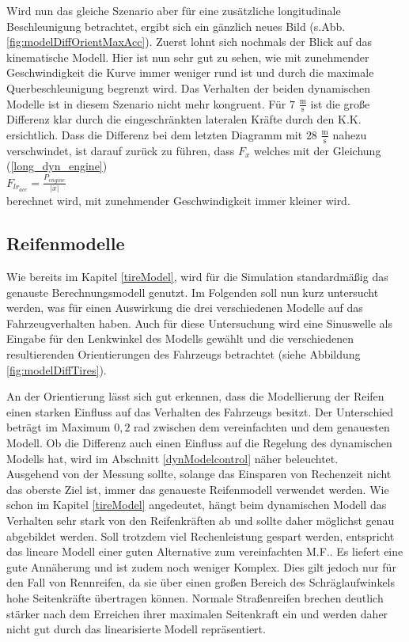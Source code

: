 \documentclass{like}
\begin{document}
Wird nun das gleiche Szenario aber für eine zusätzliche longitudinale Beschleunigung betrachtet, ergibt sich ein gänzlich neues Bild (s.Abb. \ref{fig:modelDiffOrientMaxAcc}).
Zuerst lohnt sich nochmals der Blick auf das kinematische Modell. Hier ist nun sehr gut zu sehen, wie mit zunehmender Geschwindigkeit die Kurve immer weniger rund ist und durch die maximale Querbeschleunigung begrenzt wird. Das Verhalten der beiden dynamischen Modelle ist in diesem Szenario nicht mehr kongruent. Für $7$ $\frac{\text{m}}{\text{s}}$ ist die große Differenz klar durch die eingeschränkten lateralen Kräfte durch den \ac{K.K.} ersichtlich. Dass die Differenz bei dem letzten Diagramm mit $28$ $\frac{\text{m}}{\text{s}}$ nahezu verschwindet, ist darauf zurück zu führen, dass $F_x$ welches mit der Gleichung (\ref{long_dyn_engine}) \\ 
$F_{lr_{acc}} = \frac{P_{engine}}{|\dot{x}|}$\\
berechnet wird, mit zunehmender Geschwindigkeit immer kleiner wird. 


\subsection{Reifenmodelle}
Wie bereits im Kapitel \ref{tireModel}, wird für die Simulation standardmäßig das genauste Berechnungsmodell genutzt. Im Folgenden soll nun kurz untersucht werden, was für einen Auswirkung die drei verschiedenen Modelle auf das Fahrzeugverhalten haben. Auch für diese Untersuchung wird eine Sinuswelle als Eingabe für den Lenkwinkel des Modells gewählt und die verschiedenen resultierenden Orientierungen des Fahrzeugs betrachtet (siehe Abbildung \ref{fig:modelDiffTires}).


An der Orientierung lässt sich gut erkennen, dass die Modellierung der Reifen einen starken Einfluss auf das Verhalten des Fahrzeugs besitzt. Der Unterschied beträgt im Maximum $0,2$ rad zwischen dem vereinfachten und dem genauesten Modell. 
Ob die Differenz auch einen Einfluss auf die Regelung des dynamischen Modells hat, wird im Abschnitt \ref{dynModelcontrol} näher beleuchtet. \\
Ausgehend von der Messung sollte, solange das Einsparen von Rechenzeit nicht das oberste Ziel ist, immer das genaueste Reifenmodell verwendet werden. Wie schon im Kapitel \ref{tireModel} angedeutet, hängt beim dynamischen Modell das Verhalten sehr stark von den Reifenkräften ab und sollte daher möglichst genau abgebildet werden. Soll trotzdem viel Rechenleistung gespart werden, entspricht das lineare Modell einer guten Alternative zum vereinfachten \ac{M.F.}. Es liefert eine gute Annäherung und ist zudem noch weniger Komplex. Dies gilt jedoch nur für den Fall von Rennreifen, da sie über einen großen Bereich des Schräglaufwinkels hohe Seitenkräfte übertragen können. Normale Straßenreifen brechen deutlich stärker nach dem Erreichen ihrer maximalen Seitenkraft ein und werden daher nicht gut durch das linearisierte Modell repräsentiert. 
\end{document}

